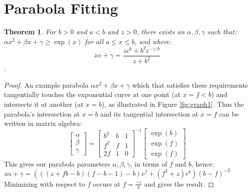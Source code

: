 \documentclass[]{interact}
\theoremstyle{plain}%
\newtheorem{Theorem}{Theorem}[section]
\theoremstyle{definition}
\theoremstyle{remark}
\begin{document}






\appendix




\section{Parabola Fitting}\label{appendix1}

\begin{Theorem}\label{thm:parabola}
For $b>0$ and $a<b$ and $z>0$, there exists an $\alpha,\beta,\gamma$ such that: $\alpha x^2+\beta x+\gamma\ge \exp(x)$ for all $a\le x\le b$, and where:
$$z\alpha+\gamma = \frac{ze^b + b^2e^{-z/b}}{z + b^2}$$.
\end{Theorem}
\begin{proof}
An example parabola $\alpha x^2+\beta x+\gamma$ which that satisfies these requirements tangentially touches the exponential curve at one point (at $x=f<b$) and intersects it at another (at $x=b$), as illustrated in Figure \ref{fig:graph1}.
Thus the parabola's intersection at $x=b$ and its tangential intersection at $x=f$ can be written in matrix algebra:
$$
\begin{bmatrix}
    \alpha \\
    \beta \\
	\gamma
\end{bmatrix}
=
\begin{bmatrix}
    b^2 & b & 1 \\
    f^2 & f & 1 \\
	2f  & 1 & 0
\end{bmatrix}^{-1}
\begin{bmatrix}
    \exp(b) \\
    \exp(f) \\
	\exp(f)
\end{bmatrix}$$
This gives our parabola parameters $\alpha,\beta,\gamma$, in terms of $f$ and $b$, hence:\\
\-\hspace{3mm}$z\alpha+\gamma = (((z+fb-b)(f-b-1)-b)e^f+(f^2+z)e^b)(b-f)^{-2}$\\
Minimizing with respect to $f$ occurs at $f=\frac{-z}{b}$ and gives the result.
\end{proof}

\vspace{2cm}
\end{document}
